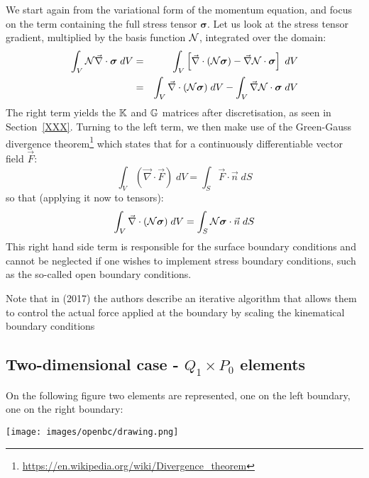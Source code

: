We start again from the variational form of the momentum equation, and focus on the term containing 
the full stress tensor ${\bm \sigma}$. 
Let us look at the stress tensor gradient, multiplied by the basis function ${\mathcal{N}}$, integrated over the domain:
\begin{eqnarray}
\int_V {\mathcal{N}} {\vec \nabla}\cdot {\bm \sigma} \; dV 
&=&\int_V \left[ {\vec \nabla}\cdot({\mathcal{N}} {\bm \sigma}) -{\vec \nabla} {\mathcal{N}} \cdot {\bm \sigma}\right] \; dV \nonumber\\
&=& \int_V  {\vec \nabla}\cdot({\mathcal{N}} {\bm \sigma})\;  dV -\int_V  {\vec \nabla}{\mathcal{N}} \cdot {\bm \sigma} \; dV
\end{eqnarray}
The right term yields the ${\mathbb{K}}$ and ${\mathbb{G}}$ matrices after discretisation, as seen in Section~\ref{XXX}.
Turning to the left term, we then make use of the Green-Gauss divergence 
theorem\footnote{\url{https://en.wikipedia.org/wiki/Divergence_theorem}} which states that for 
a continuously differentiable vector field $\vec{F}$:
\[
\int_V ({\vec \nabla} \cdot {\vec F})\; dV = \int _S {\vec F}\cdot {\vec n} \; dS
\]
so that (applying it now to tensors):
\[
\int_V  {\vec \nabla}\cdot({\mathcal{N}} {\bm \sigma})\;  dV =\int_S  {\mathcal{N}} {\bm \sigma} \cdot {\vec n} \;  dS
\]
This right hand side term is responsible for the surface 
boundary conditions and cannot be neglected if one 
wishes to implement stress boundary conditions, 
such as the so-called open boundary conditions. 

Note that in \textcite{lige17} (2017) the authors describe an iterative algorithm that 
allows them to control the actual force applied at the boundary by 
scaling the kinematical boundary conditions

\subsection{Two-dimensional case - $Q_1 \times P_0$ elements}

On the following figure two elements are represented, one on the 
left boundary, one on the right boundary:
\begin{center}
\texttt{[image: images/openbc/drawing.png]}
\end{center}

